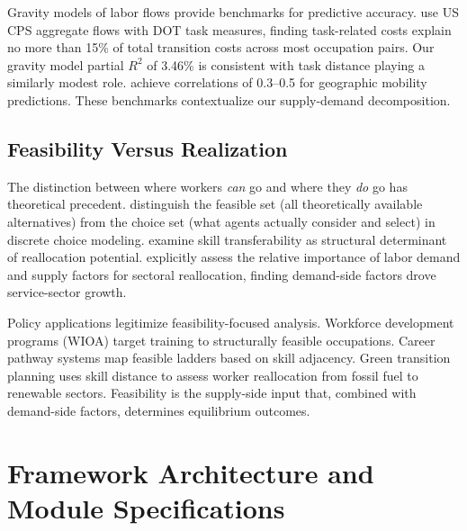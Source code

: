 \documentclass[12pt]{article}
\begin{document}
Gravity models of labor flows provide benchmarks for predictive accuracy. \citet{CortesGallipoli2018} use US CPS aggregate flows with DOT task measures, finding task-related costs explain no more than 15\% of total transition costs across most occupation pairs. Our gravity model partial $R^2$ of 3.46\% is consistent with task distance playing a similarly modest role. \citet{SiminiEtAl2021} achieve correlations of 0.3--0.5 for geographic mobility predictions. These benchmarks contextualize our supply-demand decomposition.


\subsection{Feasibility Versus Realization}
\label{subsec:lit-feasibility}


The distinction between where workers \emph{can} go and where they \emph{do} go has theoretical precedent. \citet{BarseghyanEtAl2021} distinguish the feasible set (all theoretically available alternatives) from the choice set (what agents actually consider and select) in discrete choice modeling. \citet{YiMuellerStegmaier2017} examine skill transferability as structural determinant of reallocation potential. \citet{LeeWolpin2006} explicitly assess the relative importance of labor demand and supply factors for sectoral reallocation, finding demand-side factors drove service-sector growth.

Policy applications legitimize feasibility-focused analysis. Workforce development programs (WIOA) target training to structurally feasible occupations. Career pathway systems map feasible ladders based on skill adjacency. Green transition planning uses skill distance to assess worker reallocation from fossil fuel to renewable sectors. Feasibility is the supply-side input that, combined with demand-side factors, determines equilibrium outcomes.



\section{Framework Architecture and Module Specifications}
\label{sec:theory}
\end{document}
